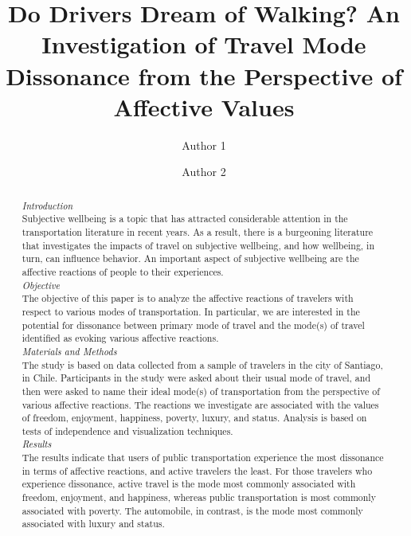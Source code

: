\documentclass[]{elsarticle} %
\begin{document}
\begin{frontmatter}

  \title{Do Drivers Dream of Walking? An Investigation of Travel Mode Dissonance
from the Perspective of Affective Values}
    \author[Some University]{Author 1}
    \author[Some School]{Author 2}
      \address[Some University]{Department, Street, City, State, Zip}
    \address[Some School]{Department, Street, City, State, Zip}
    
  \begin{abstract}
  \emph{Introduction}\\
  Subjective wellbeing is a topic that has attracted considerable
  attention in the transportation literature in recent years. As a result,
  there is a burgeoning literature that investigates the impacts of travel
  on subjective wellbeing, and how wellbeing, in turn, can influence
  behavior. An important aspect of subjective wellbeing are the affective
  reactions of people to their experiences.\\
  \emph{Objective}\\
  The objective of this paper is to analyze the affective reactions of
  travelers with respect to various modes of transportation. In
  particular, we are interested in the potential for dissonance between
  primary mode of travel and the mode(s) of travel identified as evoking
  various affective reactions.\\
  \emph{Materials and Methods}\\
  The study is based on data collected from a sample of travelers in the
  city of Santiago, in Chile. Participants in the study were asked about
  their usual mode of travel, and then were asked to name their ideal
  mode(s) of transportation from the perspective of various affective
  reactions. The reactions we investigate are associated with the values
  of freedom, enjoyment, happiness, poverty, luxury, and status. Analysis
  is based on tests of independence and visualization techniques.\\
  \emph{Results}\\
  The results indicate that users of public transportation experience the
  most dissonance in terms of affective reactions, and active travelers
  the least. For those travelers who experience dissonance, active travel
  is the mode most commonly associated with freedom, enjoyment, and
  happiness, whereas public transportation is most commonly associated
  with poverty. The automobile, in contrast, is the mode most commonly
  associated with luxury and status.
  \end{abstract}
  
 \end{frontmatter}
\end{document}
